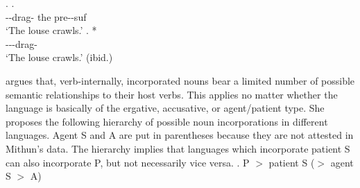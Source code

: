 \ex.
 \ag.    \\
	--drag- the {\sc pre}--{\sc suf} \\
	`The louse crawls.'
 \bg. * \\
	---drag- \\
	`The louse crawls.'
	\hfill{(ibid.)}

 argues that,
verb-internally, incorporated nouns bear a limited number of possible semantic relationships to their host verbs.
This applies no matter whether the language is basically of the ergative, accusative, or agent/patient type.
She proposes the following hierarchy of possible noun incorporations in different languages.
Agent S and A are put in parentheses because they are not attested in Mithun's data.
The hierarchy implies that
languages which incorporate patient S can also incorporate P,
but not necessarily vice versa.
%
\ex. P $>$ patient S ($>$ agent S $>$ A)


